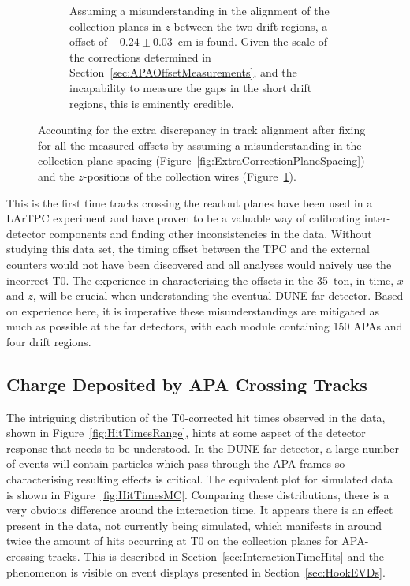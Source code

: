 \begin{figure}
\begin{subfigure}[t]{0.48\linewidth}
    \caption{Assuming a misunderstanding in the alignment of the collection planes in $z$ between the two drift regions, a offset of $-0.24\pm0.03$~cm is found.  Given the scale of the corrections determined in Section~\ref{sec:APAOffsetMeasurements}, and the incapability to measure the gaps in the short drift regions, this is eminently credible.}
    \label{fig:ExtraCorrectionWire}
  \end{subfigure}
  \caption[Accounting for the extra discrepancy in track alignment after fixing for all the measured offsets by assuming a misunderstanding in the collection plane spacing and the $z$-positions of the collection wires.]{Accounting for the extra discrepancy in track alignment after fixing for all the measured offsets by assuming a misunderstanding in the collection plane spacing (Figure~\ref{fig:ExtraCorrectionPlaneSpacing}) and the $z$-positions of the collection wires (Figure~\ref{fig:ExtraCorrectionWire}).}
  \label{fig:ExtraCorrections}
\end{figure}

This is the first time tracks crossing the readout planes have been used in a LArTPC experiment and have proven to be a valuable way of calibrating inter-detector components and finding other inconsistencies in the data.  Without studying this data set, the timing offset between the TPC and the external counters would not have been discovered and all analyses would naively use the incorrect T0.  The experience in characterising the offsets in the 35~ton, in time, $x$ and $z$, will be crucial when understanding the eventual DUNE far detector.  Based on experience here, it is imperative these misunderstandings are mitigated as much as possible at the far detectors, with each module containing 150 APAs and four drift regions.

\subsection{Charge Deposited by APA Crossing Tracks}\label{sec:APACrossingCharge}

The intriguing distribution of the T0-corrected hit times observed in the data, shown in Figure~\ref{fig:HitTimesRange}, hints at some aspect of the detector response that needs to be understood.  In the DUNE far detector, a large number of events will contain particles which pass through the APA frames so characterising resulting effects is critical.  The equivalent plot for simulated data is shown in Figure~\ref{fig:HitTimesMC}.  Comparing these distributions, there is a very obvious difference around the interaction time. It appears there is an effect present in the data, not currently being simulated, which manifests in around twice the amount of hits occurring at T0 on the collection planes for APA-crossing tracks.  This is described in Section~\ref{sec:InteractionTimeHits} and the phenomenon is visible on event displays presented in Section~\ref{sec:HookEVDs}.

